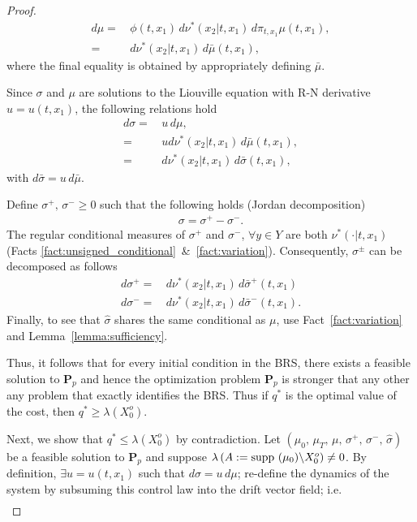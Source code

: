 \documentclass[dvipsnames]{article}
\providecommand{\supp}{\ensuremath \text{supp }}
\begin{document}
\begin{proof}
\begin{align*}
\label{eq:domination:conditional:2}
   d\mu =&\,\phi(t,x_1)\,d\nu^*(x_2|t,x_1)\,d\pi_{t,x_1}\mu(t,x_1),\\\nonumber
    =&\,d\nu^*(x_2|t,x_1)\,d\bar\mu(t,x_1),
\end{align*}
where the final equality is obtained by appropriately defining $\bar\mu$.
\par
Since $\sigma$ and $\mu$ are solutions to the Liouville equation with R-N derivative \mbox{$u=u(t,x_1)$}, the following relations hold
\begin{align*}
  d\sigma=&\,u\,d\mu,\\
  =&\,ud\nu^*(x_2|t,x_1)\,d\bar\mu(t,x_1),\\
  =&\,d\nu^*(x_2|t,x_1)\,d\bar\sigma(t,x_1),
\end{align*}
with $d\bar \sigma=u\,d\bar\mu$.
\par
Define $\sigma^+,\,\sigma^-\ge 0$ such that the following holds (Jordan decomposition)
\begin{align*}
  \sigma=\sigma^+-\sigma^-.
\end{align*}
The regular conditional measures of $\sigma^+$ and $\sigma^-$, $\forall y\in Y$ are both $\nu^*(\cdot|t,x_1)$ (Facts \ref{fact:unsigned_conditional}~\&~\ref{fact:variation}). Consequently, $\sigma^\pm$ can be decomposed as follows
\begin{align*}
  d\sigma^+=&\,d\nu^*(x_2|t,x_1)\,d\bar\sigma^+(t,x_1)\\
  d\sigma^-=&\,d\nu^*(x_2|t,x_1)\,d\bar\sigma^-(t,x_1).
\end{align*}
Finally, to see that $\hat\sigma$ shares the same conditional as $\mu$, use Fact~\ref{fact:variation} and Lemma~\ref{lemma:sufficiency}.
\par
Thus, it follows that for every initial condition in the BRS, there exists a feasible solution to {\bf P$_p$} and hence the optimization problem {\bf P$_p$} is stronger that any other any problem that exactly identifies the BRS. Thus if $q^*$ is the optimal value of the cost, then $q^*\ge \lambda(X_0^o)$.
\par
Next, we show that $q^*\le \lambda(X_0^o)$ by contradiction. Let $(\mu_0,\,\mu_T,\,\mu,\,\sigma^+,\,\sigma^-,\,\hat\sigma)$ be a feasible solution to {\bf P$_p$} and suppose $\lambda\,(A:=\supp(\mu_0)\backslash X_0^o)\ne 0$. By definition, $\exists u=u(t,x_1)$ such that $d\sigma=u\,d\mu$; re-define the dynamics of the system by subsuming this control law into the drift vector field; i.e.
\begin{align*}

\end{align*}
\end{proof}
\end{document}
